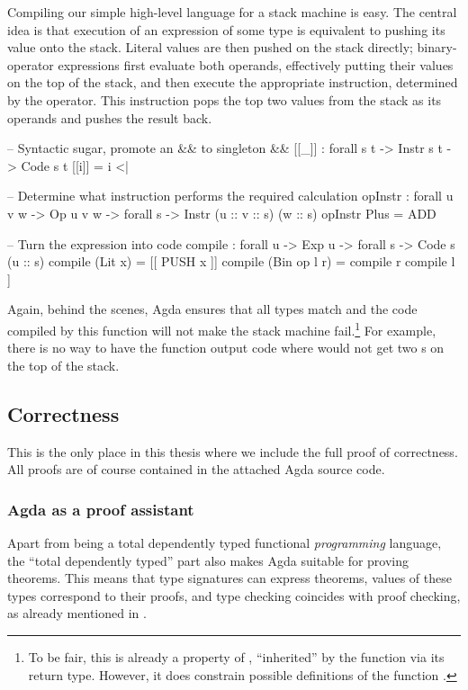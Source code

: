 Compiling our simple high-level language for a stack machine is easy. The
central idea is that execution of an expression of some type is equivalent to
pushing its value onto the stack. Literal values are then pushed on the stack
directly; binary-operator expressions first evaluate both operands, effectively
putting their values on the top of the stack, and then execute the appropriate
instruction, determined by the operator. This instruction pops the top
two values from the stack as its operands and pushes the result back.

\label{sec:simple-compiler}\begin{code}
  -- Syntactic sugar, promote an && to singleton &&
  [[_\;]] : forall {s t} -> Instr s t -> Code s t
  [[i\;]] = i <| \nil

  -- Determine what instruction performs the required calculation
  opInstr : forall {u v w} -> Op u v w -> forall {s} -> Instr (u :: v :: s) (w :: s)
  opInstr Plus = ADD

  -- Turn the expression into code
  compile : forall {u} -> Exp u -> forall {s} -> Code s (u :: s)
  compile (Lit x) = [[ PUSH x ]]
  compile (Bin op l r) = compile r \app compile l \app [[ opInstr op ]]
\end{code}

\noindent Again, behind the scenes, Agda ensures that all types match and the
code compiled by this function will not make the stack machine fail.\footnote{
  To be fair, this is already a property of , ``inherited'' by the
  function  via its return type.  However, it does constrain
possible definitions of the function .} For example, there is no
way to have the function  output code where  would
not get two s on the top of the stack.

\subsection{Correctness}

This is the only place in this thesis where we include the full proof
of correctness. All proofs are of course contained in the attached Agda source
code.

\subsubsection{Agda as a proof assistant}

Apart from being a total dependently typed functional \emph{programming} language,
the ``total dependently typed'' part also makes Agda suitable for proving theorems.
This means that type signatures can express theorems, values of these
types correspond to their proofs, and type checking coincides with proof checking,
as already mentioned in .

